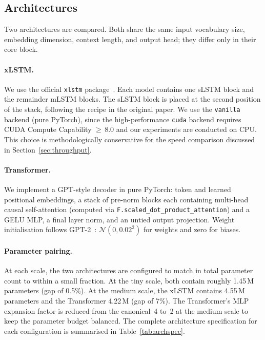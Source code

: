\documentclass[11pt]{article}
\begin{document}
\subsection{Architectures}

Two architectures are compared. Both share the same input vocabulary
size, embedding dimension, context length, and output head; they differ
only in their core block.

\paragraph{xLSTM.}
We use the official \texttt{xlstm} package~\cite{beck2024}. Each model
contains one sLSTM block and the remainder mLSTM blocks. The sLSTM block
is placed at the second position of the stack, following the recipe in
the original paper. We use the \texttt{vanilla} backend (pure PyTorch),
since the high-performance \texttt{cuda} backend requires CUDA Compute
Capability \(\ge\)\,8.0 and our experiments are conducted on CPU. This
choice is methodologically conservative for the speed comparison
discussed in Section~\ref{sec:throughput}.

\paragraph{Transformer.}
We implement a GPT-style decoder in pure PyTorch: token and learned
positional embeddings, a stack of pre-norm blocks each containing
multi-head causal self-attention (computed via
\texttt{F.scaled\_dot\_product\_attention}) and a GELU MLP, a final
layer norm, and an untied output projection. Weight initialisation
follows GPT-2~\cite{radford2019}: \(\mathcal{N}(0, 0.02^2)\) for weights and
zero for biases.

\paragraph{Parameter pairing.}
At each scale, the two architectures are configured to match in total
parameter count to within a small fraction. At the tiny scale, both
contain roughly 1.45\,M parameters (gap of 0.5\%). At the medium scale,
the xLSTM contains 4.55\,M parameters and the Transformer 4.22\,M (gap
of 7\%). The Transformer's MLP expansion factor is reduced from the
canonical~4 to~2 at the medium scale to keep the parameter budget
balanced. The complete architecture specification for each
configuration is summarised in Table~\ref{tab:archspec}.
\end{document}
